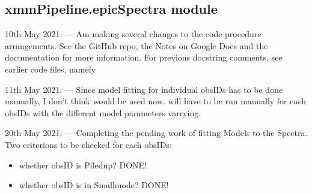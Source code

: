 \documentclass[letterpaper,10pt,english]{sphinxmanual}
\begin{document}

\begin{fulllineitems}
\label{\detokenize{xmmPipeline:xmmPipeline.epicPipeline.reduceData_method}}
\pysigstartsignatures
{}
\pysigstopsignatures
\end{fulllineitems}


\begin{fulllineitems}
\label{\detokenize{xmmPipeline:xmmPipeline.epicPipeline.runIndiBkgCircFuncs_method}}
\pysigstartsignatures
{}
\pysigstopsignatures
\end{fulllineitems}



\subsection{xmmPipeline.epicSpectra module}
\label{\detokenize{xmmPipeline:module-xmmPipeline.epicSpectra}}\label{\detokenize{xmmPipeline:xmmpipeline-epicspectra-module}}
\sphinxAtStartPar
10th May 2021:
—
Am making several changes to the code procedure arrangements.
See the GitHub repo, the Notes on Google Docs and the documentation for more information.
For previous docstring comments, see earlier code files, namely 

\sphinxAtStartPar
11th May 2021:
—
Since model fitting for individual obsIDs has to be done manually, I don’t think
 would be used now.  will have to be run manually
for each obsIDs with the different model parameters varrying.

\sphinxAtStartPar
20th May 2021:
—
Completing the pending work of fitting Models to the Spectra.
Two criterions to be checked for each obsIDs:
\begin{itemize}
\item {} 
\sphinxAtStartPar
whether obsID is Piled\sphinxhyphen{}up? DONE!

\item {} 
\sphinxAtStartPar
whether obsID is in Small\sphinxhyphen{}mode? DONE!

\end{itemize}
\end{document}
